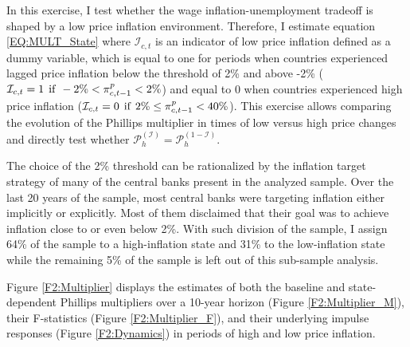 \documentclass[12pt]{article}
\begin{document}
In this exercise, I test whether the wage inflation-unemployment tradeoff is shaped by a low price inflation environment. Therefore, I estimate equation \ref{EQ:MULT_State} where $\mathcal{I}_{c,t}$ is an indicator of low price inflation defined as a dummy variable, which is equal to one for periods when countries experienced lagged price inflation below the threshold of 2\% and above -2\% ($\mathcal{I}_{c,t} = 1 \hspace{1ex} \text{if} \hspace{1ex} -2\% < \pi^p_{c,t-1} < 2\%$) and equal to 0 when countries experienced high price inflation ($\mathcal{I}_{c,t} = 0 \hspace{1ex} \text{if} \hspace{1ex} 2\% \leq \pi^p_{c,t-1} < 40\%$). This exercise allows comparing the evolution of the Phillips multiplier in times of low versus high price changes and directly test whether $\mathcal{P}_h^{(\mathcal{I})} = \mathcal{P}_h^{(1-\mathcal{I})}$.

The choice of the 2\% threshold can be rationalized by the inflation target strategy of many of the central banks present in the analyzed sample. Over the last 20 years of the sample, most central banks were targeting inflation either implicitly or explicitly. Most of them disclaimed that their goal was to achieve inflation close to or even below 2\%. With such division of the sample, I assign 64\% of the sample to a high-inflation state and 31\% to the low-inflation state while the remaining 5\% of the sample is left out of this sub-sample analysis.

Figure \ref{F2:Multiplier} displays the estimates of both the baseline and state-dependent Phillips multipliers over a 10-year horizon (Figure \ref{F2:Multiplier_M}), their F-statistics (Figure \ref{F2:Multiplier_F}), and their underlying impulse responses (Figure \ref{F2:Dynamics}) in periods of high and low price inflation.
\end{document}
